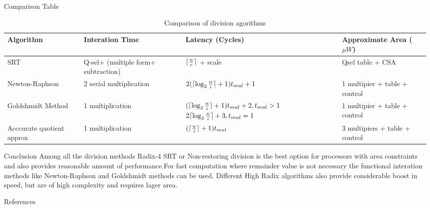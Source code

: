 \documentclass[10pt]{beamer}
\DeclarePairedDelimiter{\ceil}{\lceil}{\rceil}
\begin{document}
\begin{frame}{Comparison Table}
\begin{table}[h!]
\fontsize{5.5}{10}\selectfont
\centering
 \begin{tabular}{|p{2cm}|p{2cm}|p{3cm}|p{2cm}|}
 \hline
 Algorithm & Interation Time & Latency (Cycles) & Approximate Area ($\mu W$) \\
 \hline\hline
 SRT & Q-sel+ (multiple form+ subtraction) & $\ceil{\frac{n}{r}}$ + scale & Qsel table + CSA\\ %
 \hline
 Newton-Raphson & 2 serial multiplication & $2(\ceil{\log_2{\frac{n}{i}}} + 1)t_{mul} + 1$ & 1 multipier + table + control \\
 \hline
 Goldshmidt Method & 1 multiplication & $(\ceil{\log_2{\frac{n}{i}}} + 1)t_{mul} + 2, t_{mul} > 1$ $2\ceil{\log_2{\frac{n}{i}}} + 3, t_{mul} = 1$ & 1 multipier + table + control \\[1.5em]
 \hline
Acccurate quotient approx & 1 multiplication & $(\ceil{\frac{n}{i}} + 1)t_{mul}$ & 3 multipiers + table + control \\%
 \hline
\end{tabular}
\caption{Comparison of division agorithms}
\label{table:2}
\end{table}
\end{frame}

\begin{frame}{Conclusion}
Among all the division methods Radix-4 SRT or Non-restoring division is the best option for processors with area constraints and also provides reasonable amount of performance.\newline \newline For fast computation where remainder value is not necessary the functional interation methods like Newton-Raphson and Goldshmidt methods can be used.
\newline \newline Different High Radix algorithms also provide considerable boost in speed, but are of high complexity and requires lager area.
\end{frame}

\begin{frame}{References}
\tiny
    \printbibliography   
\end{frame}
\end{document}
